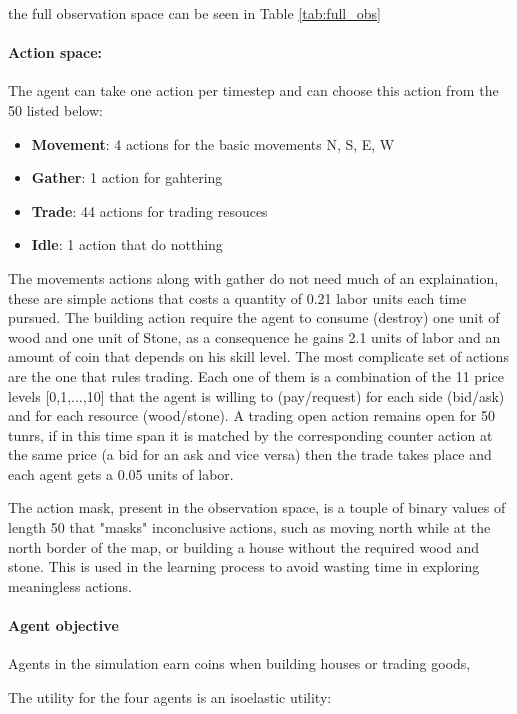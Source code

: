 the full observation space can be seen in Table \ref{tab:full_obs}

\paragraph{Action space:} The agent can take one action per timestep and can choose this action from the 50 listed below:

\begin{itemize}
    \item \textbf{Movement}: 4 actions for the basic movements N, S, E, W
    \item \textbf{Gather}: 1 action for gahtering
    \item \textbf{Trade}: 44 actions for trading resouces
    \item \textbf{Idle}: 1 action that do notthing
\end{itemize}

The movements actions along with gather do not need much of an explaination, these are simple actions that costs a quantity of 0.21 labor units each time pursued. The building action require the agent to consume (destroy) one unit of wood and one unit of Stone, as a consequence he gains 2.1 units of labor and an amount of coin that depends on his skill level. The most complicate set of actions are the one that rules trading. Each one of them is a combination of the 11 price levels [0,1,...,10] that the agent is willing to (pay/request) for each side (bid/ask) and for each resource (wood/stone). A trading open action remains open for 50 tunrs, if in this time span it is matched by the corresponding counter action at the same price (a bid for an ask and vice versa) then the trade takes place and each agent gets a 0.05 units of labor.

The action mask, present in the observation space, is a touple of binary values of length 50 that "masks" inconclusive actions, such as moving north while at the north border of the map, or building a house without the required wood and stone. This is used in the learning process to avoid wasting time in exploring meaningless actions.

\paragraph{Agent objective}

Agents in the simulation earn coins when building houses or trading goods, 

The utility for the four agents is an isoelastic utility:

